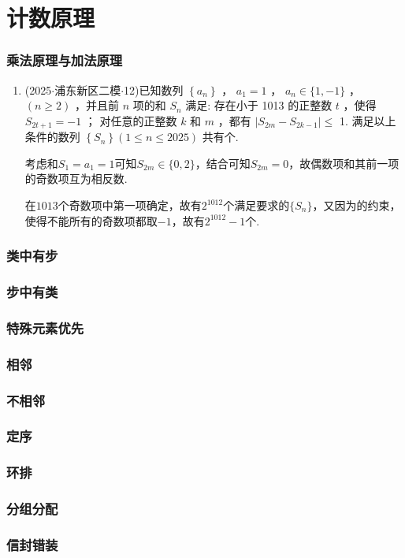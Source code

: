 \chapter*{计数原理}
\subsection*{乘法原理与加法原理}
\begin{enumerate}
    \item (2025$\cdot$浦东新区二模$\cdot$12)已知数列 $\left\{  {a}_{n}\right\}$ ， ${a}_{1} = 1$ ， ${a}_{n} \in  \{ 1, - 1\}$ ， $\left( {n \geq  2}\right)$ ，并且前 $n$ 项的和 ${S}_{n}$ 满足:    存在小于 1013 的正整数 $t$ ，使得 ${S}_{{2t} + 1} =  - 1$ ；   对任意的正整数 $k$ 和 $m$ ，都有 $\left| {{S}_{2m} - {S}_{{2k} - 1}}\right|  \leq$ 1. 满足以上条件的数列 $\left\{  {S}_{n}\right\}  \left( {1 \leq  n \leq  {2025}}\right)$ 共有个.
    \begin{jieda}
        考虑和$S_1 = a_1 = 1$可知$S_{2m} \in \{0, 2\}$，结合可知$S_{2m} = 0$，故偶数项和其前一项的奇数项互为相反数.

        在$1013$个奇数项中第一项确定，故有$2^{1012}$个满足要求的$\{S_{n}\}$，又因为的约束，使得不能所有的奇数项都取$-1$，故有${2}^{1012} - 1$个.
    \end{jieda}
\end{enumerate}
\subsection*{类中有步}
\subsection*{步中有类}
\subsection*{特殊元素优先}
\subsection*{相邻}
\subsection*{不相邻}
\subsection*{定序}
\subsection*{环排}
\subsection*{分组分配}
\subsection*{信封错装}